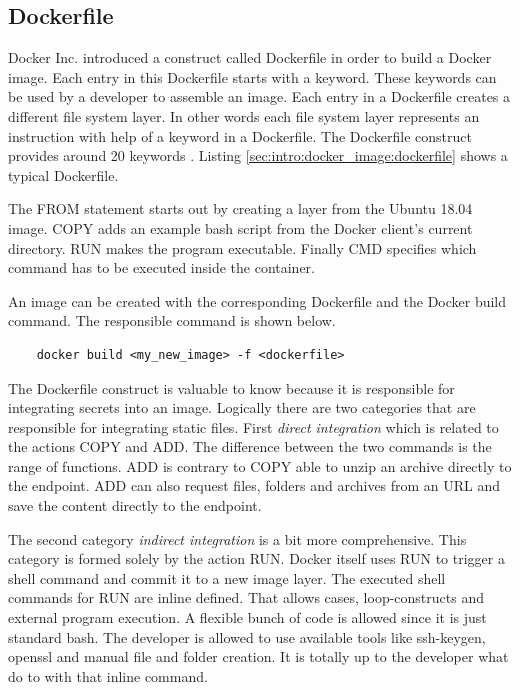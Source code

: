 \subsection{Dockerfile}
\label{sec:intro:docker_image:docker_img:dockerfile}
Docker Inc. introduced a construct called Dockerfile in order to build a Docker image.
Each entry in this Dockerfile starts with a keyword. 
These keywords can be used by a developer to assemble an image. 
Each entry in a Dockerfile creates a different file system layer. 
In other words each file system layer represents an instruction with help of a keyword in a Dockerfile.
The Dockerfile construct provides around 20 keywords \cite{dockerfile_ref}.
Listing \ref{sec:intro:docker_image:dockerfile} shows a typical Dockerfile.

The FROM statement starts out by creating a layer from the Ubuntu 18.04 image. 
COPY adds an example bash script from the Docker client’s current directory. 
RUN makes the program executable. 
Finally CMD specifies which command has to be executed inside the container.

An image can be created with the corresponding Dockerfile and the Docker build command. The responsible command is shown below.
\begin{lstlisting}
	docker build <my_new_image> -f <dockerfile>
\end{lstlisting}
The Dockerfile construct is valuable to know because it is responsible for integrating secrets into an image. 
Logically there are two categories that are responsible for integrating static files.
First \textit{direct integration} which is related to the actions COPY and ADD. 
The difference between the two commands is the range of functions. 
ADD is contrary to COPY able to unzip an archive directly to the endpoint.
ADD can also request files, folders and archives from an URL and save the content directly to the endpoint.

The second category \textit{indirect integration} is a bit more comprehensive. 
This category is formed solely by the action RUN.
Docker itself uses RUN to trigger a shell command and commit it to a new image layer.
The executed shell commands for RUN are inline defined. That allows cases, loop-constructs and external program execution. 
A flexible bunch of code is allowed since it is just standard bash. 
The developer is allowed to use available tools like ssh-keygen, openssl and manual file and folder creation.
It is totally up to the developer what do to with that inline command. 

